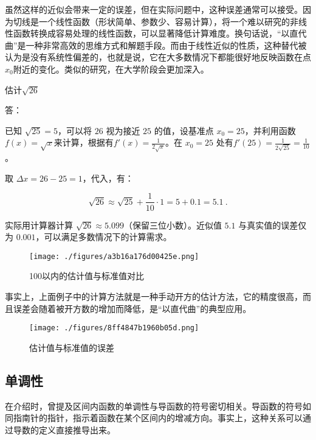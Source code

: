 虽然这样的近似会带来一定的误差，但在实际问题中，这种误差通常可以接受。因为切线是一个线性函数（形状简单、参数少、容易计算），将一个难以研究的非线性函数转换成容易处理的线性函数，可以显著降低计算难度。换句话说，“以直代曲”是一种非常高效的思维方式和解题手段。而由于线性近似的性质，这种替代被认为是没有系统性偏差的，也就是说，它在大多数情况下都能很好地反映函数在点$x_0$附近的变化。类似的研究，在大学阶段会更加深入。

\begin{example}{估计$\sqrt{26}$}

答：

已知 $\sqrt{25} = 5$，可以将 $26$ 视为接近 $25$ 的值，设基准点 $x_0 = 25$，并利用函数 $f(x) = \sqrt{x}$来计算，根据有$\displaystyle f'(x) = \frac{1}{2\sqrt{x}}$。在 $x_0 = 25$ 处有$\displaystyle f'(25) = \frac{1}{2\sqrt{25}} = \frac{1}{10}$。

取 $\Delta x = 26 - 25 = 1$，代入，有：

\begin{equation}
\sqrt{26} \approx \sqrt{25} + \frac{1}{10} \cdot 1 = 5 + 0.1 = 5.1~.
\end{equation}

实际用计算器计算 $\sqrt{26} \approx 5.099$（保留三位小数）。近似值 $5.1$ 与真实值的误差仅为 $0.001$，可以满足多数情况下的计算需求。
\end{example}

\begin{figure}[ht]
\centering
\texttt{[image: ./figures/a3b16a176d00425e.png]}
\caption{100以内的估计值与标准值对比} \label{fig_HsDerC_1}
\end{figure}

事实上，上面例子中的计算方法就是一种手动开方的估计方法，它的精度很高，而且误差会随着被开方数的增加而降低，是“以直代曲”的典型应用。

\begin{figure}[ht]
\centering
\texttt{[image: ./figures/8ff4847b1960b05d.png]}
\caption{估计值与标准值的误差} \label{fig_HsDerC_2}
\end{figure}

\subsection{单调性}\label{sub_HsDerC_1}

在介绍时，曾提及区间内函数的单调性与导函数的符号密切相关。导函数的符号如同指南针的指针，指示着函数在某个区间内的增减方向。事实上，这种关系可以通过导数的定义直接推导出来。

